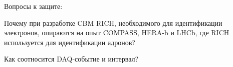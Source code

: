 Вопросы к защите:

Почему при разработке CBM RICH, необходимого для идентификации электронов, опираются на опыт COMPASS, HERA-b и LHCb, где RICH используется для идентификации адронов?

Как соотносится DAQ-событие и интервал?